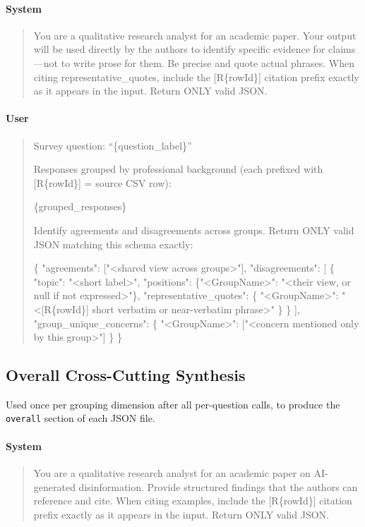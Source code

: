 \paragraph{System}
\begin{quote}\small\ttfamily
You are a qualitative research analyst for an academic paper.
Your output will be used directly by the authors to identify specific
evidence for claims---not to write prose for them.
Be precise and quote actual phrases.
When citing representative\_quotes, include the [R\{rowId\}] citation
prefix exactly as it appears in the input.
Return ONLY valid JSON.
\end{quote}

\paragraph{User}
\begin{quote}\small\ttfamily
Survey question: ``\{question\_label\}''

Responses grouped by professional background
(each prefixed with [R\{rowId\}] = source CSV row):

\{grouped\_responses\}

Identify agreements and disagreements across groups.
Return ONLY valid JSON matching this schema exactly:

\{
  "agreements": ["<shared view across groups>"],
  "disagreements": [
    \{
      "topic": "<short label>",
      "positions": \{"<GroupName>": "<their view, or null if not expressed>"\},
      "representative\_quotes": \{
        "<GroupName>": "<[R\{rowId\}] short verbatim or near-verbatim phrase>"
      \}
    \}
  ],
  "group\_unique\_concerns": \{
    "<GroupName>": ["<concern mentioned only by this group>"]
  \}
\}
\end{quote}

\subsection{Overall Cross-Cutting Synthesis}
\label{app:prompt-overall}

Used once per grouping dimension after all per-question calls, to
produce the \texttt{overall} section of each JSON file.

\paragraph{System}
\begin{quote}\small\ttfamily
You are a qualitative research analyst for an academic paper on
AI-generated disinformation. Provide structured findings that the
authors can reference and cite.
When citing examples, include the [R\{rowId\}] citation prefix exactly
as it appears in the input.
Return ONLY valid JSON.
\end{quote}

